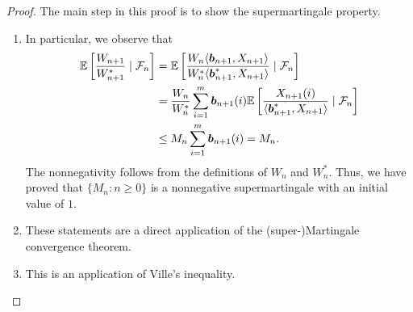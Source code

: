         \begin{proof}
        The main step in this proof is to show the supermartingale property.
        \begin{enumerate}[label=(\alph*)]
            \item In particular, we observe that 
                \begin{align}
                    \mathbb{E}\left[ \frac{ W_{n+1} }{ W_{n+1}^* } \mid \mathcal{F}_n \right]  & = \mathbb{E}\left[ \frac{ W_n \langle \boldsymbol{b}_{n+1} , X_{n+1} \rangle }{ W_n^* \langle \boldsymbol{b}^*_{n+1} , X_{n+1} \rangle} \mid \mathcal{F}_n \right]  \\
                    & = \frac{W_n}{W_n^*} \sum_{i=1}^m \boldsymbol{b}_{n+1}(i) \mathbb{E}\left[ \frac{X_{n+1}(i)}{\langle \boldsymbol{b}^*_{n+1}, X_{n+1} \rangle } \mid \mathcal{F}_n \right] \\
                    & \leq M_n \sum_{i=1}^m \boldsymbol{b}_{n+1}(i) = M_n. 
                \end{align}
                The nonnegativity follows from the definitions of $W_n$ and $W_n^*$. Thus, we have proved that $\{M_n: n \geq 0\}$ is a nonnegative supermartingale with an initial value of $1$. 
            \item These statements are a direct application of the (super-)Martingale convergence theorem. 
            \item  This is an application of Ville's inequality. 
        \end{enumerate}
    \end{proof}

